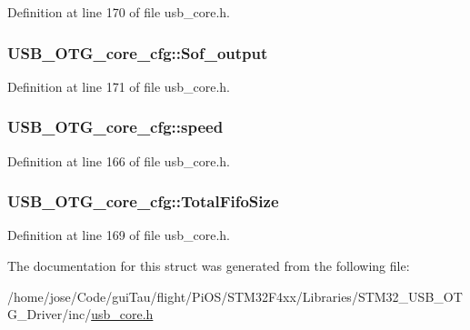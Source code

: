 Definition at line 170 of file usb\-\_\-core.\-h.

\hypertarget{struct_u_s_b___o_t_g__core__cfg_aaca3fc3f8d72b1fa9b8bf93200a82699}{
\subsubsection[{Sof\-\_\-output}]{ U\-S\-B\-\_\-\-O\-T\-G\-\_\-core\-\_\-cfg\-::\-Sof\-\_\-output}}\label{struct_u_s_b___o_t_g__core__cfg_aaca3fc3f8d72b1fa9b8bf93200a82699}


Definition at line 171 of file usb\-\_\-core.\-h.

\hypertarget{struct_u_s_b___o_t_g__core__cfg_a7f36c12839332633da8825c36773c36e}{
\subsubsection[{speed}]{ U\-S\-B\-\_\-\-O\-T\-G\-\_\-core\-\_\-cfg\-::speed}}\label{struct_u_s_b___o_t_g__core__cfg_a7f36c12839332633da8825c36773c36e}


Definition at line 166 of file usb\-\_\-core.\-h.

\hypertarget{struct_u_s_b___o_t_g__core__cfg_ac700e2573c4113d9e5f934b01ef36e2e}{
\subsubsection[{Total\-Fifo\-Size}]{ U\-S\-B\-\_\-\-O\-T\-G\-\_\-core\-\_\-cfg\-::\-Total\-Fifo\-Size}}\label{struct_u_s_b___o_t_g__core__cfg_ac700e2573c4113d9e5f934b01ef36e2e}


Definition at line 169 of file usb\-\_\-core.\-h.



The documentation for this struct was generated from the following file\-:\begin{DoxyCompactItemize}
\item 
/home/jose/\-Code/gui\-Tau/flight/\-Pi\-O\-S/\-S\-T\-M32\-F4xx/\-Libraries/\-S\-T\-M32\-\_\-\-U\-S\-B\-\_\-\-O\-T\-G\-\_\-\-Driver/inc/\hyperlink{_s_t_m32_f4xx_2_libraries_2_s_t_m32___u_s_b___o_t_g___driver_2inc_2usb__core_8h}{usb\-\_\-core.\-h}\end{DoxyCompactItemize}
